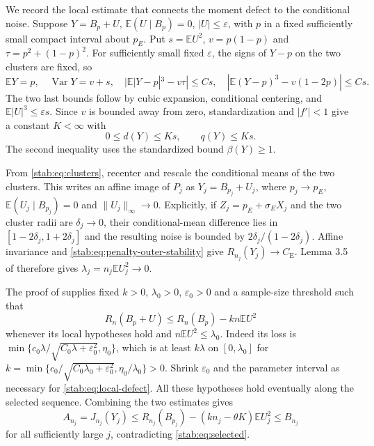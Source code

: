 \documentclass[11pt,a4paper]{article}
\numberwithin{equation}{section}
\theoremstyle{definition}
\theoremstyle{remark}
\newcommand{\E}{\mathbb E}
\newcommand{\CE}{C_{\mathrm E}}
\begin{document}
We record the local estimate that connects the moment defect to
the conditional noise. Suppose $Y=B_p+U$, $\E(U\mid B_p)=0$,
$|U|\le\varepsilon$, with $p$ in a fixed sufficiently small compact
interval about $p_E$. Put $s=\E U^2$, $v=p(1-p)$ and
$\tau=p^2+(1-p)^2$. For sufficiently small fixed $\varepsilon$,
the signs of $Y-p$ on the two clusters are fixed, so
\[
 \E Y=p,\quad \operatorname{Var}Y=v+s,\quad
 |\E|Y-p|^3-v\tau|\le C s,\quad
 |\E(Y-p)^3-v(1-2p)|\le C s.
\]
The two last bounds follow by cubic expansion, conditional centering,
and $\E|U|^3\le\varepsilon s$. Since $v$ is bounded away from zero,
standardization and $|f'|<1$ give a constant $K<\infty$ with
\begin{equation}\label{stab:eq:local-defect}
                  0\le d(Y)\le K s,\qquad q(Y)\le K s.
\end{equation}
The second inequality uses the standardized bound $\beta(Y)\ge1$.

From \eqref{stab:eq:clusters}, recenter and rescale the conditional
means of the two clusters. This writes an affine image of $P_j$ as
$Y_j=B_{p_j}+U_j$, where $p_j\to p_E$,
$\E(U_j\mid B_{p_j})=0$ and $\|U_j\|_\infty\to0$.
Explicitly, if $Z_j=p_E+\sigma_E X_j$ and the two cluster radii are
$\delta_j\to0$, their conditional-mean difference lies in
$[1-2\delta_j,1+2\delta_j]$ and the resulting noise is bounded by
$2\delta_j/(1-2\delta_j)$.
Affine invariance and \eqref{stab:eq:penalty-outer-stability} give
$R_{n_j}(Y_j)\to\CE$. Lemma 3.5 of \cite{HC} therefore gives
$\lambda_j=n_j\E U_j^2\to0$.

The proof of \cite[Lemma 3.3, equation (38)]{HC} supplies fixed
$k>0$, $\lambda_0>0$, $\varepsilon_0>0$ and a sample-size threshold
such that
\begin{equation}\label{stab:eq:local-loss}
                 R_n(B_p+U)\le R_n(B_p)-k n\E U^2
\end{equation}
whenever its local hypotheses hold and $n\E U^2\le\lambda_0$.
Indeed its loss is
$\min\{c_0\lambda/\sqrt{C_0\lambda+\varepsilon_0^2},\eta_0\}$,
which is at least $k\lambda$ on $[0,\lambda_0]$ for
$k=\min\{c_0/\sqrt{C_0\lambda_0+\varepsilon_0^2},\eta_0/\lambda_0\}>0$.
Shrink $\varepsilon_0$ and the parameter interval as necessary for
\eqref{stab:eq:local-defect}. All these hypotheses hold eventually along
the selected sequence. Combining the two estimates gives
\[
 A_{n_j}=J_{n_j}(Y_j)
       \le R_{n_j}(B_{p_j})-(k n_j-\theta K)\E U_j^2
       \le B_{n_j}
\]
for all sufficiently large $j$, contradicting \eqref{stab:eq:selected}.
\end{document}
